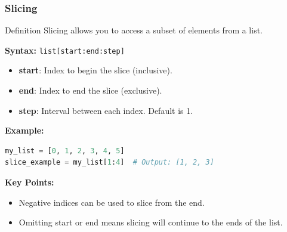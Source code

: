 \documentclass{beamer}
\begin{document}
\begin{frame}[fragile]
    \frametitle{Slicing}
    \begin{block}{Definition}
        Slicing allows you to access a subset of elements from a list.
    \end{block}
    
    \textbf{Syntax:} \texttt{list[start:end:step]} \\
    \begin{itemize}
        \item \textbf{start}: Index to begin the slice (inclusive).
        \item \textbf{end}: Index to end the slice (exclusive).
        \item \textbf{step}: Interval between each index. Default is 1.
    \end{itemize}

    \textbf{Example:}
    \begin{lstlisting}[language=Python]
my_list = [0, 1, 2, 3, 4, 5]
slice_example = my_list[1:4]  # Output: [1, 2, 3]
    \end{lstlisting}

    \textbf{Key Points:}
    \begin{itemize}
        \item Negative indices can be used to slice from the end.
        \item Omitting start or end means slicing will continue to the ends of the list.
    \end{itemize}
\end{frame}
\end{document}
